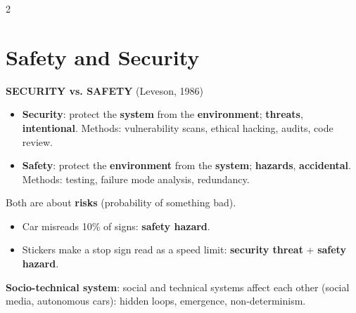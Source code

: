 \documentclass[a4paper,9pt]{extarticle}
\begin{document}

\thispagestyle{fancy}



\begin{multicols}{2}


\section{Safety and Security}


\begin{definition}

\textbf{SECURITY vs. SAFETY} (Leveson, 1986)

\begin{itemize}

\item \textbf{Security}: protect the \textbf{system} from the \textbf{environment};
\textbf{threats}, \textbf{intentional}. Methods: vulnerability scans, ethical hacking, audits,
code review.

\item \textbf{Safety}: protect the \textbf{environment} from the \textbf{system};
\textbf{hazards}, \textbf{accidental}. Methods: testing, failure mode analysis, redundancy.

\end{itemize}

Both are about \textbf{risks} (probability of something bad).

\end{definition}


\begin{example}

\begin{itemize}

\item Car misreads 10\% of signs: \textbf{safety hazard}.

\item Stickers make a stop sign read as a speed limit: \textbf{security threat} +
\textbf{safety hazard}.

\end{itemize}

\end{example}


\textbf{Socio-technical system}: social and technical systems affect each other (social media,
autonomous cars): hidden loops, emergence, non-determinism.



\end{multicols}
\end{document}
